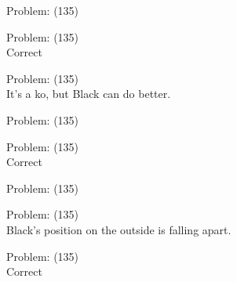 \documentclass[11pt]{article}
\begin{document}
\begin{minipage}[t]{0.5\textwidth}
  {\centering
  
Problem: (135)\\
  }
\end{minipage}
\begin{minipage}[t]{0.5\textwidth}
  {\centering
  
Problem: (135)\\
Correct\\
  }
\end{minipage}
\begin{minipage}[t]{0.5\textwidth}
  {\centering
  
Problem: (135)\\
It's a ko, but Black can do better.\\
  }
\end{minipage}
\begin{minipage}[t]{0.5\textwidth}
  {\centering
  
Problem: (135)\\
  }
\end{minipage}
\begin{minipage}[t]{0.5\textwidth}
  {\centering
  
Problem: (135)\\
Correct\\
  }
\end{minipage}
\begin{minipage}[t]{0.5\textwidth}
  {\centering
  
Problem: (135)\\
  }
\end{minipage}
\begin{minipage}[t]{0.5\textwidth}
  {\centering
  
Problem: (135)\\
Black's position on the outside is falling apart.\\
  }
\end{minipage}
\begin{minipage}[t]{0.5\textwidth}
  {\centering
  
Problem: (135)\\
Correct\\
  }
\end{minipage}
\end{document}

